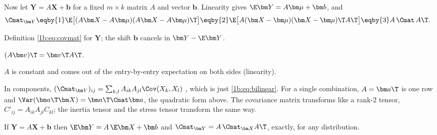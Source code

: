 Now let $\bm Y=A\bm X+\bm b$ for a fixed $m\times k$ matrix $A$ and vector $\bm b$.
Linearity gives $\E\bm Y=A\bm\mu+\bm b$, and 
\begin{align}
  \Cmat_{\bm Y}
  &\eqby{1} \E\bigl[(A\bm X-A\bm\mu)(A\bm X-A\bm\mu)\T\bigr]
   \eqby{2} \E\bigl[A(\bm X-\bm\mu)(\bm X-\bm\mu)\T A\T\bigr]
   \eqby{3} A\,\Cmat\,A\T .
  \label{1b:eq:ACAT}
\end{align}
\begin{explain}
  \item Definition \eqref{1b:eq:covmat} for $\bm Y$; the shift $\bm b$ cancels
        in $\bm Y-\E\bm Y$.
  \item $(A\bm v)\T=\bm v\T A\T$.
  \item $A$ is constant and comes out of the entry-by-entry expectation on both
        sides (linearity).
\end{explain}
In components, $(\Cmat_{\bm Y})_{ij}=\sum_{k,l}A_{ik}A_{jl}\Cov(X_k,X_l)$
, which is just \eqref{1b:eq:bilinear}. For a single
combination, $A=\bm a\T$ is one row and $\Var(\bm a\T\bm X)=\bm a\T\Cmat\bm a$,
the quadratic form above. The covariance matrix transforms like a rank-2
tensor, $C'_{ij}=A_{ik}A_{jl}C_{kl}$; the inertia tensor and the stress tensor
transform the same way.

\begin{keyidea}
If $\bm Y=A\bm X+\bm b$ then $\E\bm Y=A\,\E\bm X+\bm b$ and
$\Cmat_{\bm Y}=A\,\Cmat_{\bm X}A\T$, exactly, for any distribution.
\end{keyidea}

